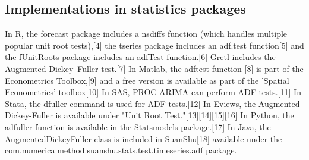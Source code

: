 \subsection*{Implementations in statistics packages}
In R, the forecast package includes a nsdiffs function (which handles multiple popular unit root tests),[4] the tseries package includes an adf.test function[5] and the fUnitRoots package includes an adfTest function.[6]
Gretl includes the Augmented Dickey–Fuller test.[7]
In Matlab, the adftest function [8] is part of the Econometrics Toolbox,[9] and a free version is available as part of the 'Spatial Econometrics' toolbox[10]
In SAS, PROC ARIMA can perform ADF tests.[11]
In Stata, the dfuller command is used for ADF tests.[12]
In Eviews, the Augmented Dickey-Fuller is available under "Unit Root Test."[13][14][15][16]
In Python, the adfuller function is available in the Statsmodels package.[17]
In Java, the AugmentedDickeyFuller class is included in SuanShu[18] available under the com.numericalmethod.suanshu.stats.test.timeseries.adf package.
